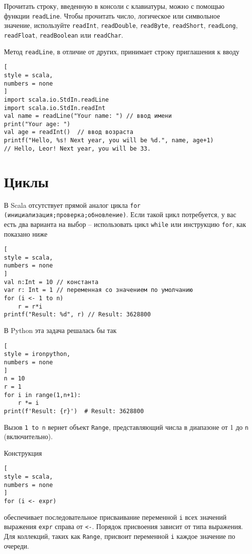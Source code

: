 \documentclass[%
	11pt,
	a4paper,
	utf8,
		]{article}
\begin{document}
Прочитать строку, введенную в консоли с клавиатуры, можно с помощью функции \texttt{readLine}. Чтобы прочитать число, логическое или символьное значение, используйте \texttt{readInt}, \texttt{readDouble}, \texttt{readByte}, \texttt{readShort}, \texttt{readLong}, \texttt{readFloat}, \texttt{readBoolean} или \texttt{readChar}.

Метод \texttt{readLine}, в отличие от других, принимает строку приглашения к вводу
\begin{lstlisting}[
style = scala,
numbers = none
]
import scala.io.StdIn.readLine
import scala.io.StdIn.readInt
val name = readLine("Your name: ") // ввод имени
print("Your age: ")
val age = readInt()  // ввод возраста
printf("Hello, %s! Next year, you will be %d.", name, age+1)
// Hello, Leor! Next year, you will be 33.
\end{lstlisting}

\section{Циклы}

В Scala отсутствует прямой аналог цикла \texttt{for (инициализация;проверка;обновление)}. Если такой цикл потребуется, у вас есть два варианта на выбор -- использовать цикл \texttt{while} или инструкцию \texttt{for}, как показано ниже
\begin{lstlisting}[
style = scala,
numbers = none
]
val n:Int = 10 // константа
var r: Int = 1 // переменная со значением по умолчанию
for (i <- 1 to n)
    r = r*i
printf("Result: %d", r) // Result: 3628800
\end{lstlisting}

В Python эта задача решалась бы так
\begin{lstlisting}[
style = ironpython,
numbers = none
]
n = 10
r = 1
for i in range(1,n+1):
    r *= i
print(f'Result: {r}')  # Result: 3628800
\end{lstlisting}

Вызов \texttt{1 to n} вернет объект \texttt{Range}, представляющий числа в диапазоне от 1 до \texttt{n} (включительно).

Конструкция
\begin{lstlisting}[
style = scala,
numbers = none
]
for (i <- expr)
\end{lstlisting}
обеспечивает последовательное присваивание переменной \texttt{i} всех значений выражения \texttt{expr} справа от \texttt{<-}. Порядок присвоения зависит от типа выражения. Для коллекций, таких как \texttt{Range}, присвоит переменной \texttt{i} каждое значение по очереди.
\end{document}

